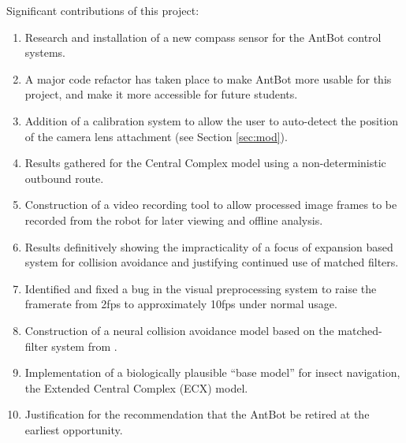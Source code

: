 \documentclass[a4paper,11pt,twoside,openright]{article}
\begin{document}
Significant contributions of this project:
\begin{enumerate}
\item{
  Research and installation of a new compass sensor for the AntBot control
  systems.
}

\item{
  A major code refactor has taken place to make AntBot more usable for this
  project, and make it more accessible for future students.
}

\item{
  Addition of a calibration system to allow the user to auto-detect the position
  of the camera lens attachment (see Section \ref{sec:mod}).
}

\item{
  Results gathered for the Central Complex model using a non-deterministic
  outbound route.
}

\item{
  Construction of a video recording tool to allow processed
  image frames to be recorded from the robot for later viewing and
  offline analysis.
}

\item{ Results definitively showing the impracticality of a focus of
    expansion based system for collision avoidance and justifying
    continued use of matched filters.
}

\item{ Identified and fixed a bug in the visual preprocessing system
  to raise the framerate from 2fps to approximately 10fps under normal usage.}

\item{ Construction of a neural collision avoidance model based on the
  matched-filter system from \cite{Mitchell2018, Stewart2010}. }


\item{
  Implementation of a biologically plausible ``base model'' for
  insect navigation, the Extended Central Complex (ECX) model.
}

\item{
 Justification for the recommendation that the AntBot be retired at
 the earliest opportunity.
}
  
\end{enumerate}
\newpage

\end{document}
